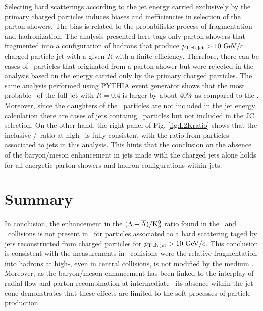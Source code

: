 Selecting hard scatterings according to the jet energy carried exclusively by the primary charged particles induces biases and inefficiencies in selection of the parton showers.
The bias is related to the probabilistic process of fragmentation and hadronization.
The analysis presented here tags only parton showers that fragmented into a configuration of hadrons that produce $p_\mathrm{T\,ch\;jet}>10~\mathrm{GeV}/c$ charged particle jet with a given $R$ with a finite efficiency.
Therefore, there can be cases of \Vzero\ particles that originated from a parton shower but were rejected in the analysis based on the energy carried only by the primary charged particles. 
The same analysis performed using PYTHIA event generator shows that the most probable \pt\ of the full jet with $R=0.4$ is larger by about 40\% as compared to the \ptch.
Moreover, since the daughters of the \Vzero\ particles are not included in the jet energy calculation there are cases of jets containig \Vzero\ particles but not included in the JC selection. 
On the other hand, the right panel of Fig. \ref{fig:L2Kratio} shows that the inclusive \lda/\ks\ ratio at high-\pt\ is fully consistent with the ratio from particles associated to jets in this analysis. This hints that the conclusion on the absence of the baryon/meson enhancement in jets made with the charged jets alone holds for all energetic parton showers and hadron configurations within jets.


\section{Summary}

In conclusion, the enhancement in the $(\Lambda+\overline{\Lambda})/\rm{K}^{0}_{\rm S}$ ratio found in the \pPb\ and \PbPb\ collisions is not present in \pPb\ for particles associated to a hard scattering taged by jets reconstructed from charged particles for $p_\mathrm{T\,ch\;jet}>10~\mathrm{GeV}/c$. 
This conclusion is consistent with the measurements in \PbPb\ collisions were the relative fragmentation into hadrons at high-\pt, even in central collisions, is not modified by the medium \cite{Abelev:2013xaa,Abelev:2014laa,Adam:2015kca}.
Moreover, as the baryon/meson enhancement has been linked to the interplay of radial flow and parton recombination at intermediate-\pt\ its absence within the jet cone demonstrates that these effects are limited to the soft processes of particle production. 


